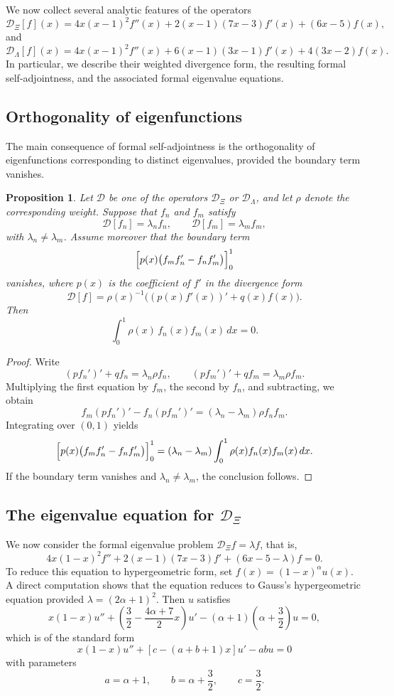 \documentclass[11pt,twoside]{article}
\newtheorem{proposition}[theorem]{Proposition}
\numberwithin{equation}{section}
\begin{document}
We now collect several analytic features of the operators
\[
\mathcal D_{\Xi}[f](x)
=
4x(x-1)^2 f''(x)
+2(x-1)(7x-3)f'(x)
+(6x-5)f(x),
\]
and
\[
\mathcal D_{\Lambda}[f](x)
=
4x(x-1)^2 f''(x)
+6(x-1)(3x-1)f'(x)
+4(3x-2)f(x).
\]
In particular, we describe their weighted divergence form, the resulting formal self-adjointness, and the associated formal eigenvalue equations.

\subsection{Orthogonality of eigenfunctions}

The main consequence of formal self-adjointness is the orthogonality of eigenfunctions corresponding to distinct eigenvalues, provided the boundary term vanishes.

\begin{proposition}\label{prop:orthogonality}
Let \(\mathcal D\) be one of the operators \(\mathcal D_{\Xi}\) or \(\mathcal D_{\Lambda}\), and let \(\rho\) denote the corresponding weight. Suppose that \(f_n\) and \(f_m\) satisfy
\[
\mathcal D[f_n]=\lambda_n f_n,
\qquad
\mathcal D[f_m]=\lambda_m f_m,
\]
with \(\lambda_n\neq\lambda_m\). Assume moreover that the boundary term
\[
\Bigl[p(x)\bigl(f_mf_n'-f_nf_m'\bigr)\Bigr]_{0}^{1}
\]
vanishes, where \(p(x)\) is the coefficient of \(f'\) in the divergence form
\[
\mathcal D[f]
=
\rho(x)^{-1}\bigl((p(x)f'(x))'+q(x)f(x)\bigr).
\]
Then
\[
\int_0^1 \rho(x)\,f_n(x)f_m(x)\,dx=0.
\]
\end{proposition}

\begin{proof}
Write
\[
(pf_n')'+qf_n=\lambda_n \rho f_n,
\qquad
(pf_m')'+qf_m=\lambda_m \rho f_m.
\]
Multiplying the first equation by \(f_m\), the second by \(f_n\), and subtracting, we obtain
\[
f_m(pf_n')'-f_n(pf_m')'=(\lambda_n-\lambda_m)\rho f_nf_m.
\]
Integrating over \((0,1)\) yields
\[
\Bigl[p(x)\bigl(f_mf_n'-f_nf_m'\bigr)\Bigr]_{0}^{1}
=
(\lambda_n-\lambda_m)\int_0^1 \rho(x)f_n(x)f_m(x)\,dx.
\]
If the boundary term vanishes and \(\lambda_n\neq\lambda_m\), the conclusion follows.
\end{proof}

\subsection{The eigenvalue equation for \texorpdfstring{$\mathcal D_{\Xi}$}{DXi}}

We now consider the formal eigenvalue problem \(\mathcal D_{\Xi}f=\lambda f\), that is,
\[
4x(1-x)^2f''+2(x-1)(7x-3)f'+(6x-5-\lambda)f=0.
\]
To reduce this equation to hypergeometric form, set \(f(x)=(1-x)^\alpha u(x)\). A direct computation shows that the equation reduces to Gauss's hypergeometric equation provided \(\lambda=(2\alpha+1)^2\). Then \(u\) satisfies
\[
x(1-x)u''+\left(\frac32-\frac{4\alpha+7}{2}x\right)u'
-(\alpha+1)\left(\alpha+\frac32\right)u=0,
\]
which is of the standard form
\[
x(1-x)u''+[c-(a+b+1)x]u'-abu=0
\]
with parameters
\[
a=\alpha+1,\qquad b=\alpha+\frac32,\qquad c=\frac32.
\]
\end{document}
